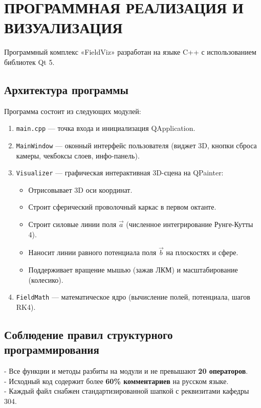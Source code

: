 \documentclass[11pt,russian]{article}
\begin{document}
\newpage

\section{ПРОГРАММНАЯ РЕАЛИЗАЦИЯ И ВИЗУАЛИЗАЦИЯ}

Программный комплекс «FieldViz» разработан на языке C++ с использованием библиотек Qt 5.

\subsection{Архитектура программы}
Программа состоит из следующих модулей:
\begin{enumerate}
    \item \texttt{main.cpp} — точка входа и инициализация QApplication.
    \item \texttt{MainWindow} — оконный интерфейс пользователя (виджет 3D, кнопки сброса камеры, чекбоксы слоев, инфо-панель).
    \item \texttt{Visualizer} — графическая интерактивная 3D-сцена на QPainter:
    \begin{itemize}
        \item Отрисовывает 3D оси координат.
        \item Строит сферический проволочный каркас в первом октанте.
        \item Строит силовые линии поля $\vec{a}$ (численное интегрирование Рунге-Кутты 4).
        \item Наносит линии равного потенциала поля $\vec{b}$ на плоскостях и сфере.
        \item Поддерживает вращение мышью (зажав ЛКМ) и масштабирование (колесико).
    \end{itemize}
    \item \texttt{FieldMath} — математическое ядро (вычисление полей, потенциала, шагов RK4).
\end{enumerate}

\subsection{Соблюдение правил структурного программирования}
- Все функции и методы разбиты на модули и не превышают \textbf{20 операторов}.\\
- Исходный код содержит более \textbf{60\% комментариев} на русском языке.\\
- Каждый файл снабжен стандартизированной шапкой с реквизитами кафедры 304.
\end{document}
